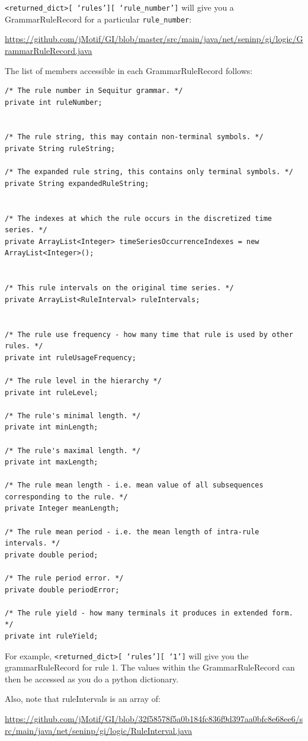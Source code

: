 \documentclass[letterpaper, 12pt]{article}
\def\bsq#1{%
	\lq{#1}\rq}
\begin{document}
\texttt{<returned\_dict>[\bsq{rules}][\bsq{rule\_number}]} will give you a GrammarRuleRecord for a particular \texttt{rule\_number}:

\small{\url{https://github.com/jMotif/GI/blob/master/src/main/java/net/seninp/gi/logic/GrammarRuleRecord.java}}

The list of members accessible in each GrammarRuleRecord follows:

\begin{lstlisting}
/* The rule number in Sequitur grammar. */
private int ruleNumber;


/* The rule string, this may contain non-terminal symbols. */
private String ruleString;

/* The expanded rule string, this contains only terminal symbols. */
private String expandedRuleString;


/* The indexes at which the rule occurs in the discretized time series. */
private ArrayList<Integer> timeSeriesOccurrenceIndexes = new ArrayList<Integer>();


/* This rule intervals on the original time series. */
private ArrayList<RuleInterval> ruleIntervals;


/* The rule use frequency - how many time that rule is used by other rules. */
private int ruleUsageFrequency;

/* The rule level in the hierarchy */
private int ruleLevel;

/* The rule's minimal length. */
private int minLength;

/* The rule's maximal length. */
private int maxLength;

/* The rule mean length - i.e. mean value of all subsequences corresponding to the rule. */
private Integer meanLength;

/* The rule mean period - i.e. the mean length of intra-rule intervals. */
private double period;

/* The rule period error. */
private double periodError;

/* The rule yield - how many terminals it produces in extended form. */
private int ruleYield;
\end{lstlisting}

For example, \texttt{<returned\_dict>[\bsq{rules}][\bsq{1}]} will give you the grammarRuleRecord for rule 1.  The values within the GrammarRuleRecord can then be accessed as you do a python dictionary.

Also, note that ruleIntervals is an array of:

\small{\url{https://github.com/jMotif/GI/blob/32f58578f5a0b184fc836f9d397aa0bfc8e68ee6/src/main/java/net/seninp/gi/logic/RuleInterval.java}}
\end{document}
